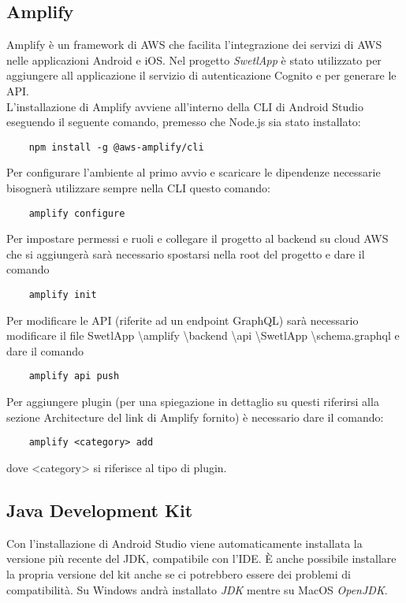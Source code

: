 \subsection{Amplify}
Amplify è un framework di AWS che facilita l'integrazione dei servizi di AWS nelle applicazioni Android e iOS. Nel progetto \emph{SwetlApp} è stato utilizzato per aggiungere all applicazione il servizio di autenticazione Cognito e per generare le API.\\[0.25cm]
L'installazione di Amplify avviene all'interno della CLI di Android Studio eseguendo il seguente comando, premesso che Node.js sia stato installato:
\begin{verbatim}
    npm install -g @aws-amplify/cli
\end{verbatim}
Per configurare l'ambiente al primo avvio e scaricare le dipendenze necessarie bisognerà utilizzare sempre nella CLI questo comando:
\begin{verbatim}
    amplify configure
\end{verbatim}
Per impostare permessi e ruoli e collegare il progetto al backend su cloud AWS che si aggiungerà sarà necessario spostarsi nella root del progetto e dare il comando
\begin{verbatim}
    amplify init
\end{verbatim}
Per modificare le API (riferite ad un endpoint GraphQL) sarà necessario modificare il file SwetlApp \textbackslash amplify \textbackslash backend \textbackslash api \textbackslash SwetlApp \textbackslash schema.graphql e dare il comando 
\begin{verbatim}
    amplify api push
\end{verbatim}
Per aggiungere plugin (per una spiegazione in dettaglio su questi riferirsi alla sezione Architecture del link di Amplify fornito) è necessario dare il comando:
\begin{verbatim}
    amplify <category> add
\end{verbatim}
dove <category> si riferisce al tipo di plugin.

\subsection{Java Development Kit}
Con l'installazione di Android Studio viene automaticamente installata la versione più recente del JDK, compatibile con l'IDE. È anche possibile installare la propria versione del kit anche se ci potrebbero essere dei problemi di compatibilità. Su Windows andrà installato \emph{JDK} mentre su MacOS \emph{OpenJDK}.